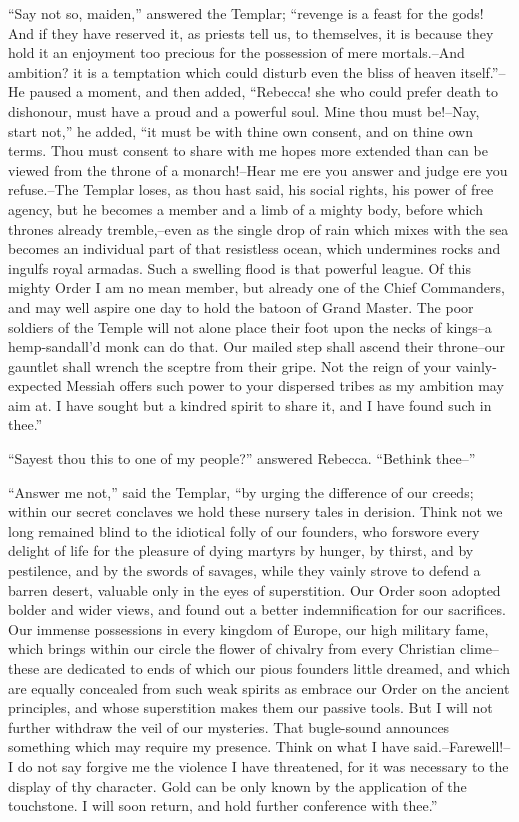 ``Say not so, maiden,'' answered the Templar; ``revenge is a feast for
the gods! And if they have reserved it, as priests tell us, to
themselves, it is because they hold it an enjoyment too precious for the
possession of mere mortals.--And ambition? it is a temptation which
could disturb even the bliss of heaven itself.''--He paused a moment,
and then added, ``Rebecca! she who could prefer death to dishonour, must
have a proud and a powerful soul. Mine thou must be!--Nay, start not,''
he added, ``it must be with thine own consent, and on thine own terms.
Thou must consent to share with me hopes more extended than can be
viewed from the throne of a monarch!--Hear me ere you answer and judge
ere you refuse.--The Templar loses, as thou hast said, his social
rights, his power of free agency, but he becomes a member and a limb of
a mighty body, before which thrones already tremble,--even as the single
drop of rain which mixes with the sea becomes an individual part of that
resistless ocean, which undermines rocks and ingulfs royal armadas. Such
a swelling flood is that powerful league. Of this mighty Order I am no
mean member, but already one of the Chief Commanders, and may well
aspire one day to hold the batoon of Grand Master. The poor soldiers of
the Temple will not alone place their foot upon the necks of kings--a
hemp-sandall'd monk can do that. Our mailed step shall ascend their
throne--our gauntlet shall wrench the sceptre from their gripe. Not the
reign of your vainly-expected Messiah offers such power to your
dispersed tribes as my ambition may aim at. I have sought but a kindred
spirit to share it, and I have found such in thee.''

``Sayest thou this to one of my people?'' answered Rebecca. ``Bethink
thee--''

``Answer me not,'' said the Templar, ``by urging the difference of our
creeds; within our secret conclaves we hold these nursery tales in
derision. Think not we long remained blind to the idiotical folly of our
founders, who forswore every delight of life for the pleasure of dying
martyrs by hunger, by thirst, and by pestilence, and by the swords of
savages, while they vainly strove to defend a barren desert, valuable
only in the eyes of superstition. Our Order soon adopted bolder and
wider views, and found out a better indemnification for our sacrifices.
Our immense possessions in every kingdom of Europe, our high military
fame, which brings within our circle the flower of chivalry from every
Christian clime--these are dedicated to ends of which our pious founders
little dreamed, and which are equally concealed from such weak spirits
as embrace our Order on the ancient principles, and whose superstition
makes them our passive tools. But I will not further withdraw the veil
of our mysteries. That bugle-sound announces something which may require
my presence. Think on what I have said.--Farewell!--I do not say forgive
me the violence I have threatened, for it was necessary to the display
of thy character. Gold can be only known by the application of the
touchstone. I will soon return, and hold further conference with thee.''

